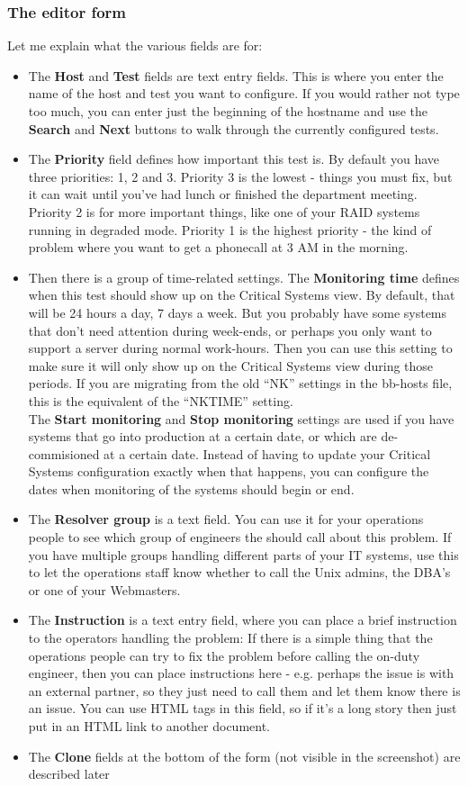 \subsubsection*{The editor form}
 Let me explain what the various fields are for: \begin{itemize}
\item The \textbf{Host}
 and \textbf{Test}
 fields are text entry fields. This is where you enter the name of the host and test you want to configure. If you would rather not type too much, you can enter just the beginning of the hostname and use the \textbf{Search}
 and \textbf{Next}
 buttons to walk through the currently configured tests.
\item The \textbf{Priority}
 field defines how important this test is. By default you have three priorities: 1, 2 and 3. Priority 3 is the lowest - things you must fix, but it can wait until you've had lunch or finished the department meeting. Priority 2 is for more important things, like one of your RAID systems running in degraded mode. Priority 1 is the highest priority - the kind of problem where you want to get a phonecall at 3 AM in the morning.
\item Then there is a group of time-related settings. The \textbf{Monitoring time}
 defines when this test should show up on the Critical Systems view. By default, that will be 24 hours a day, 7 days a week. But you probably have some systems that don't need attention during week-ends, or perhaps you only want to support a server during normal work-hours. Then you can use this setting to make sure it will only show up on the Critical Systems view during those periods. If you are migrating from the old ``NK'' settings in the bb-hosts file, this is the equivalent of the ``NKTIME'' setting.\\ 
 The \textbf{Start monitoring}
 and \textbf{Stop monitoring}
 settings are used if you have systems that go into production at a certain date, or which are de-commisioned at a certain date. Instead of having to update your Critical Systems configuration exactly when that happens, you can configure the dates when monitoring of the systems should begin or end.
\item The \textbf{Resolver group}
 is a text field. You can use it for your operations people to see which group of engineers the should call about this problem. If you have multiple groups handling different parts of your IT systems, use this to let the operations staff know whether to call the Unix admins, the DBA's or one of your Webmasters.
\item The \textbf{Instruction}
 is a text entry field, where you can place a brief instruction to the operators handling the problem: If there is a simple thing that the operations people can try to fix the problem before calling the on-duty engineer, then you can place instructions here - e.g. perhaps the issue is with an external partner, so they just need to call them and let them know there is an issue. You can use HTML tags in this field, so if it's a long story then just put in an HTML link to another document.
\item The \textbf{Clone}
 fields at the bottom of the form (not visible in the screenshot) are described later


\end{itemize}
